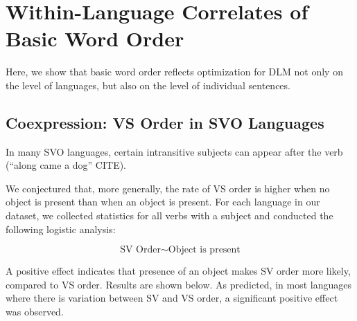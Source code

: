 \documentclass[11pt,a4paper]{article}
\begin{document}





\section{Within-Language Correlates of Basic Word Order}

Here, we show that basic word order reflects optimization for DLM not only on the level of languages, but also on the level of individual sentences.

\subsection{Coexpression: VS Order in SVO Languages}
In many SVO languages, certain intransitive subjects can appear after the verb (``along came a dog'' CITE).


We conjectured that, more generally, the rate of VS order is higher when no object is present than when an object is present.
For each language in our dataset, we collected statistics for all verbs with a subject and conducted the following logistic analysis:

\begin{equation}
\text{SV Order} \sim \text{Object is present}
\end{equation}

A positive effect indicates that presence of an object makes SV order more likely, compared to VS order.
Results are shown below.
As predicted, in most languages where there is variation between SV and VS order, a significant positive effect was observed.
\end{document}
